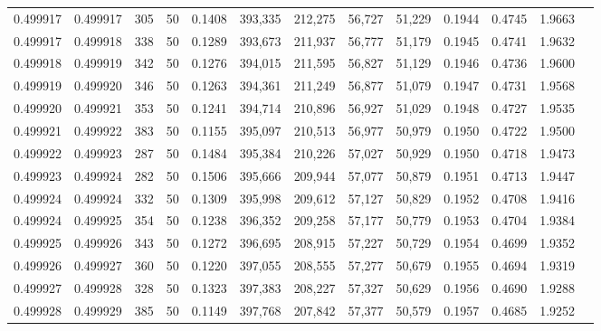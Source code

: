 \begin{tabular}{rrrrrrrrrrrrr}
0.499917 & 0.499917 & 305 &  50 &                                     0.1408 & 393,335 & 212,275 &  56,727 &  51,229 & 0.1944 & 0.4745 & 1.9663 \\
0.499917 & 0.499918 & 338 &  50 &                                     0.1289 & 393,673 & 211,937 &  56,777 &  51,179 & 0.1945 & 0.4741 & 1.9632 \\
0.499918 & 0.499919 & 342 &  50 &                                     0.1276 & 394,015 & 211,595 &  56,827 &  51,129 & 0.1946 & 0.4736 & 1.9600 \\
0.499919 & 0.499920 & 346 &  50 &                                     0.1263 & 394,361 & 211,249 &  56,877 &  51,079 & 0.1947 & 0.4731 & 1.9568 \\
0.499920 & 0.499921 & 353 &  50 &                                     0.1241 & 394,714 & 210,896 &  56,927 &  51,029 & 0.1948 & 0.4727 & 1.9535 \\
0.499921 & 0.499922 & 383 &  50 &                                     0.1155 & 395,097 & 210,513 &  56,977 &  50,979 & 0.1950 & 0.4722 & 1.9500 \\
0.499922 & 0.499923 & 287 &  50 &                                     0.1484 & 395,384 & 210,226 &  57,027 &  50,929 & 0.1950 & 0.4718 & 1.9473 \\
0.499923 & 0.499924 & 282 &  50 &                                     0.1506 & 395,666 & 209,944 &  57,077 &  50,879 & 0.1951 & 0.4713 & 1.9447 \\
0.499924 & 0.499924 & 332 &  50 &                                     0.1309 & 395,998 & 209,612 &  57,127 &  50,829 & 0.1952 & 0.4708 & 1.9416 \\
0.499924 & 0.499925 & 354 &  50 &                                     0.1238 & 396,352 & 209,258 &  57,177 &  50,779 & 0.1953 & 0.4704 & 1.9384 \\
0.499925 & 0.499926 & 343 &  50 &                                     0.1272 & 396,695 & 208,915 &  57,227 &  50,729 & 0.1954 & 0.4699 & 1.9352 \\
0.499926 & 0.499927 & 360 &  50 &                                     0.1220 & 397,055 & 208,555 &  57,277 &  50,679 & 0.1955 & 0.4694 & 1.9319 \\
0.499927 & 0.499928 & 328 &  50 &                                     0.1323 & 397,383 & 208,227 &  57,327 &  50,629 & 0.1956 & 0.4690 & 1.9288 \\
0.499928 & 0.499929 & 385 &  50 &                                     0.1149 & 397,768 & 207,842 &  57,377 &  50,579 & 0.1957 & 0.4685 & 1.9252 \\

\end{tabular}
